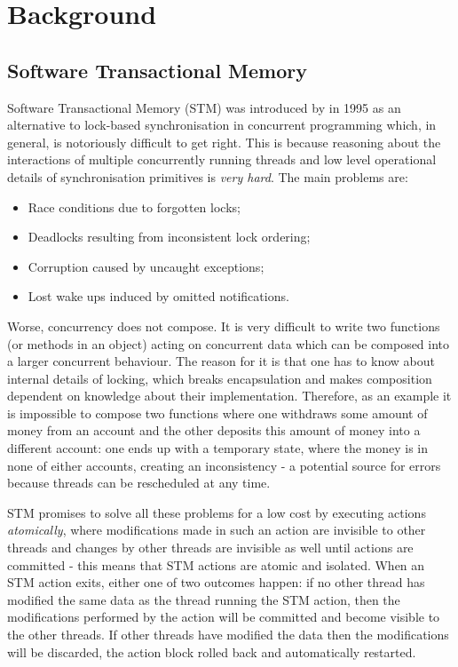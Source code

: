 \section{Background}
\label{sec:background}

\subsection{Software Transactional Memory}
Software Transactional Memory (STM) was introduced by \cite{shavit_software_1995} in 1995 as an alternative to lock-based synchronisation in concurrent programming which, in general, is notoriously difficult to get right. This is because reasoning about the interactions of multiple concurrently running threads and low level operational details of synchronisation primitives is \textit{very hard}. The main problems are:

\begin{itemize}
	\item Race conditions due to forgotten locks;
	\item Deadlocks resulting from inconsistent lock ordering;
	\item Corruption caused by uncaught exceptions;
	\item Lost wake ups induced by omitted notifications.
\end{itemize}

Worse, concurrency does not compose. It is very difficult to write two functions (or methods in an object) acting on concurrent data which can be composed into a larger concurrent behaviour. The reason for it is that one has to know about internal details of locking, which breaks encapsulation and makes composition dependent on knowledge about their implementation. Therefore, as an example it is impossible to compose two  functions where one withdraws some amount of money from an account and the other deposits this amount of money into a different account: one ends up with a temporary state, where the money is in none of either accounts, creating an inconsistency - a potential source for errors because threads can be rescheduled at any time.

STM promises to solve all these problems for a low cost by executing actions \textit{atomically}, where modifications made in such an action are invisible to other threads and changes by other threads are invisible as well until actions are committed - this means that STM actions are atomic and isolated. When an STM action exits, either one of two outcomes happen: if no other thread has modified the same data as the thread running the STM action, then the modifications performed by the action will be committed and become visible to the other threads. If other threads have modified the data then the modifications will be discarded, the action block rolled back and automatically restarted.

